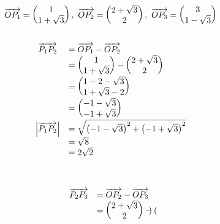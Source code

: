 \begin{gather*}
  \overrightarrow{OP_{1}} =\begin{pmatrix}
    1\\
    1+\sqrt{3}
  \end{pmatrix} ,\ \overrightarrow{OP_{2}} =\begin{pmatrix}
    2+\sqrt{3}\\
    2
  \end{pmatrix} ,\ \overrightarrow{OP_{3}} =\begin{pmatrix}
    3\\
    1-\sqrt{3}
  \end{pmatrix}\\
  \\
  \begin{array}{ c l }
    \overrightarrow{P_{1} P_{2}} & =\overrightarrow{OP_{1}} -\overrightarrow{OP_{2}}\\
    & =\begin{pmatrix}
      1\\
      1+\sqrt{3}
    \end{pmatrix} -\begin{pmatrix}
      2+\sqrt{3}\\
      2
    \end{pmatrix}\\
    & =\begin{pmatrix}
      1-2-\sqrt{3}\\
      1+\sqrt{3} -2
    \end{pmatrix}\\
    & =\begin{pmatrix}
      -1-\sqrt{3}\\
      -1+\sqrt{3}
    \end{pmatrix}\\
    \left| \overrightarrow{P_{1} P_{2}}\right|  & =\sqrt{\left( -1-\sqrt{3}\right)^{2} +\left( -1+\sqrt{3}\right)^{2}}\\
    & =\sqrt{8}\\
    & =2\sqrt{2}
  \end{array}\\
  \\
  \\
  \begin{array}{ c l }
    \overrightarrow{P_{2} P_{3}} & =\overrightarrow{OP_{2}} -\overrightarrow{OP_{3}}\\
    & =\begin{pmatrix}
      2+\sqrt{3}\\
      2
    \end{pmatrix} -\begin{pmatrix}

\end{pmatrix}
\end{array}
\end{gather*}
